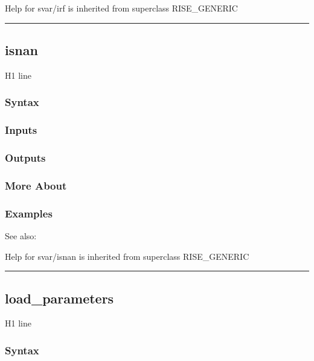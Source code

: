 \documentclass[letterpaper,10pt,english]{sphinxmanual}
\begin{document}
Help for svar/irf is inherited from superclass RISE\_GENERIC


\bigskip\hrule{}\bigskip



\subsection{isnan}
\label{classes/models/@svar/svar:isnan}\label{classes/models/@svar/svar:id34}
H1 line


\subsubsection{Syntax}
\label{classes/models/@svar/svar:id35}

\subsubsection{Inputs}
\label{classes/models/@svar/svar:id36}

\subsubsection{Outputs}
\label{classes/models/@svar/svar:id37}

\subsubsection{More About}
\label{classes/models/@svar/svar:id38}

\subsubsection{Examples}
\label{classes/models/@svar/svar:id39}
See also:

Help for svar/isnan is inherited from superclass RISE\_GENERIC


\bigskip\hrule{}\bigskip



\subsection{load\_parameters}
\label{classes/models/@svar/svar:load-parameters}\label{classes/models/@svar/svar:id40}
H1 line


\subsubsection{Syntax}
\label{classes/models/@svar/svar:id41}
\end{document}
